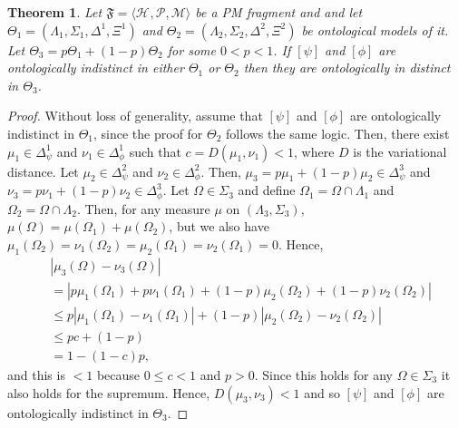 \documentclass[DIV=calc,paper=a4,fontsize=11pt,twocolumn]{scrartcl} %
\theoremstyle{definition}
\theoremstyle{plain}
\newtheorem{theorem}[definition]{Theorem}
\newcommand{\Proj}[1]{\ensuremath{\left [ #1 \right ]}}
\newcommand{\Hilb}[1][]{\ensuremath{\mathcal{H}_{#1}}}
\begin{document}
\begin{theorem}
\label{the:Pair:ind}
Let $\mathfrak{F} = \langle \Hilb, \mathcal{P}, \mathcal{M} \rangle$
be a PM fragment and and let $\Theta_1 = (\Lambda_1, \Sigma_1,
\Delta^1, \Xi^1)$ and $\Theta_2 = (\Lambda_2, \Sigma_2, \Delta^2,
\Xi^2)$ be ontological models of it.  Let $\Theta_3 = p \Theta_1 +
(1-p)\Theta_2$ for some $0 < p < 1$.  If $\Proj{\psi}$ and
$\Proj{\phi}$ are ontologically indistinct in either $\Theta_1$ or
$\Theta_2$ then they are ontologically in distinct in $\Theta_3$.
\end{theorem}
\begin{proof}
Without loss of generality, assume that $\Proj{\psi}$ and
$\Proj{\phi}$ are ontologically indistinct in $\Theta_1$, since the
proof for $\Theta_2$ follows the same logic.  Then, there exist $\mu_1
\in \Delta^1_{\psi}$ and $\nu_1 \in \Delta^1_{\phi}$ such that
$c = D(\mu_1, \nu_1) < 1$, where $D$ is the variational distance.  Let
$\mu_2 \in \Delta^2_{\psi}$ and $\nu_2 \in \Delta^2_{\phi}$.  Then,
$\mu_3 = p \mu_1 + (1-p)\mu_2 \in \Delta^3_{\psi}$ and $\nu_3 = p
\nu_1 + (1-p) \nu_2 \in \Delta^3_{\phi}$.  Let $\Omega \in \Sigma_3$
and define $\Omega_1 = \Omega \cap \Lambda_1$ and $\Omega_2 = \Omega
\cap \Lambda_2$.  Then, for any measure $\mu$ on $(\Lambda_3,
\Sigma_3)$, $\mu(\Omega) = \mu(\Omega_1) + \mu(\Omega_2)$, but we
also have $\mu_1(\Omega_2) = \nu_1(\Omega_2) = \mu_2(\Omega_1) =
\nu_2(\Omega_1) = 0$.  Hence,
\begin{align}
&\left | \mu_3(\Omega) - \nu_3(\Omega) \right | \nonumber\\
& = \left |
p\mu_1(\Omega_1) + p\nu_1(\Omega_1) +
(1-p)\mu_2(\Omega_2) + (1-p)\nu_2(\Omega_2) \right | \\
& \leq p \left | \mu_1(\Omega_1) - \nu_1(\Omega_1) \right | +
(1-p) \left | \mu_2(\Omega_2) - \nu_2(\Omega_2) \right | \\
& \leq p c + (1-p) \\
& = 1 - (1-c)p,
\end{align}
and this is $< 1$ because $0 \leq c < 1$ and $p > 0$.  Since this
holds for any $\Omega \in \Sigma_3$ it also holds for the supremum.
Hence, $D(\mu_3,\nu_3) < 1$ and so $\Proj{\psi}$ and $\Proj{\phi}$
are ontologically indistinct in $\Theta_3$.
\end{proof}
\end{document}
